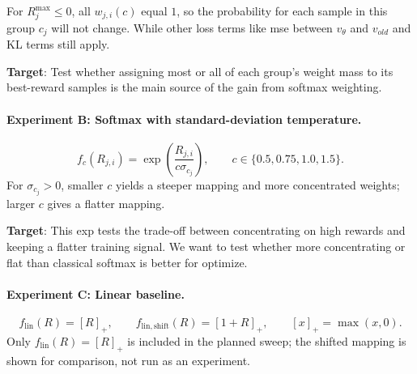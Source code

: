 \documentclass[10pt]{article} %
\begin{document}
For \(R_j^{\max}\le0\),
all $w_{j,i}(c)$ equal \(1\), so the probability for each sample in this group $c_j$ will not change. While other loss terms like mse between $v_{\theta}$ and $v_{old}$ and KL terms still apply.

\textbf{Target}: Test whether assigning most or all of each group's weight
mass to its best-reward samples is the main source of the gain from
softmax weighting.

\paragraph{Experiment B: Softmax with standard-deviation temperature.}

\[
f_c(R_{j,i})=\exp\!\left(\frac{R_{j,i}}{c\sigma_{c_j}}\right),
\qquad c\in\{0.5,0.75,1.0,1.5\}.
\]
For \(\sigma_{c_j}>0\), smaller \(c\) yields a steeper mapping and more
concentrated weights; larger \(c\) gives a flatter mapping.

\textbf{Target}: This exp tests
the trade-off between concentrating on high rewards and keeping a flatter
training signal. We want to test whether more concentrating or flat than classical softmax is better for optimize.

\paragraph{Experiment C: Linear baseline.}
\[
f_{\mathrm{lin}}(R)=[R]_+,
\qquad
f_{\mathrm{lin,shift}}(R)=[1+R]_+,
\qquad [x]_+=\max(x,0).
\]
Only \(f_{\mathrm{lin}}(R)=[R]_+\) is included in the planned sweep;
the shifted mapping is shown for comparison, not run as an experiment.
\end{document}
